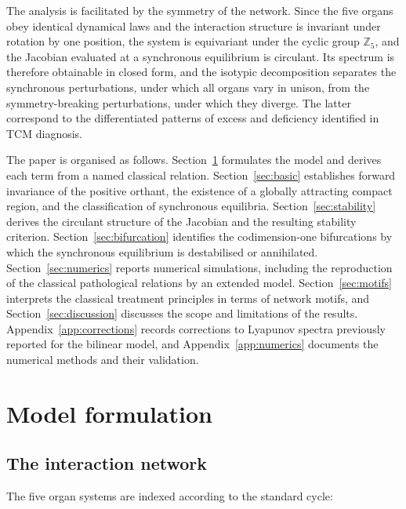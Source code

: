 \documentclass[11pt]{article}
\newcommand{\Z}{{\mathbb{Z}}}
\theoremstyle{definition}
\theoremstyle{remark}
\begin{document}
	The analysis is facilitated by the symmetry of the network. Since the five organs
	obey identical dynamical laws and the interaction structure is invariant under
	rotation by one position, the system is equivariant under the cyclic group $\Z_5$,
	and the Jacobian evaluated at a synchronous equilibrium is circulant. Its spectrum
	is therefore obtainable in closed form, and the isotypic decomposition separates the
	synchronous perturbations, under which all organs vary in unison, from the
	symmetry-breaking perturbations, under which they diverge. The latter correspond to
	the differentiated patterns of excess and deficiency identified in TCM diagnosis.
	
	The paper is organised as follows. Section~\ref{sec:model} formulates the model and
	derives each term from a named classical relation. Section~\ref{sec:basic}
	establishes forward invariance of the positive orthant, the existence of a globally
	attracting compact region, and the classification of synchronous equilibria.
	Section~\ref{sec:stability} derives the circulant structure of the Jacobian and the
	resulting stability criterion. Section~\ref{sec:bifurcation} identifies the
	codimension-one bifurcations by which the synchronous equilibrium is destabilised or
	annihilated. Section~\ref{sec:numerics} reports numerical simulations, including the
	reproduction of the classical pathological relations by an extended model.
	Section~\ref{sec:motifs} interprets the classical treatment principles in terms of
	network motifs, and Section~\ref{sec:discussion} discusses the scope and limitations
	of the results. Appendix~\ref{app:corrections} records corrections to Lyapunov
	spectra previously reported for the bilinear model, and
	Appendix~\ref{app:numerics} documents the numerical methods and their validation.
	
	\section{Model formulation}\label{sec:model}
	
	\subsection{The interaction network}
	
	The five organ systems are indexed according to the standard cycle:
	
\end{document}
